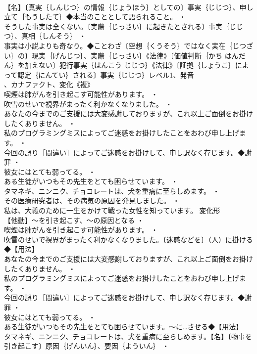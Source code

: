 \documentclass[8pt]{extreport}
\begin{document}
\begin{CJK}{UTF8}{min}
\\	【名】〔真実｛しんじつ｝の情報｛じょうほう｝としての〕事実｛じじつ｝、申し立て｛もうしたて｝◆本当のこととして語られること。 ・
\\	そうした事実は全くない。〔実際｛じっさい｝に起きたとされる〕事実｛じじつ｝、真相｛しんそう｝ ・
\\	事実は小説よりも奇なり。◆ことわざ〔空想｛くうそう｝ではなく実在｛じつざい｝の〕現実｛げんじつ｝、実際｛じっさい｝《法律》〔価値判断｛かち はんだん｝を加えない〕犯行事実｛はんこう じじつ｝《法律》〔証拠｛しょうこ｝によって認定｛にんてい｝される〕事実｛じじつ｝レベル1、発音
\\	、カナファクト、変化《複》
\\	喫煙は肺がんを引き起こす可能性があります。 ・
\\	吹雪のせいで視界がまったく利かなくなりました。 ・
\\	あなたの今までのご支援には大変感謝しておりますが、これ以上ご面倒をお掛けしたくありません。 ・
\\	私のプログラミングミスによってご迷惑をお掛けしたことをおわび申し上げます。 ・
\\	今回の誤り［間違い］によってご迷惑をお掛けして、申し訳なく存じます。◆謝罪 ・
\\	彼女にはとても弱ってる。 ・
\\	ある生徒がいつもその先生をとても困らせています。 ・
\\	タマネギ、ニンニク、チョコレートは、犬を重病に至らしめます。 ・
\\	その医療研究者は、その病気の原因を発見しました。 ・
\\	私は、大義のために一生をかけて戦った女性を知っています。	変化形 
\\	【他動】～を引き起こす、～の原因となる ・
\\	喫煙は肺がんを引き起こす可能性があります。 ・
\\	吹雪のせいで視界がまったく利かなくなりました。〔迷惑などを〕（人）に掛ける◆【用法】
\\	あなたの今までのご支援には大変感謝しておりますが、これ以上ご面倒をお掛けしたくありません。 ・
\\	私のプログラミングミスによってご迷惑をお掛けしたことをおわび申し上げます。 ・
\\	今回の誤り［間違い］によってご迷惑をお掛けして、申し訳なく存じます。◆謝罪 ・
\\	彼女にはとても弱ってる。 ・
\\	ある生徒がいつもその先生をとても困らせています。～に…させる◆【用法】
\\	タマネギ、ニンニク、チョコレートは、犬を重病に至らしめます。【名】〔物事を引き起こす〕原因｛げんいん｝、要因｛よういん｝ ・

\end{CJK}
\end{document}
